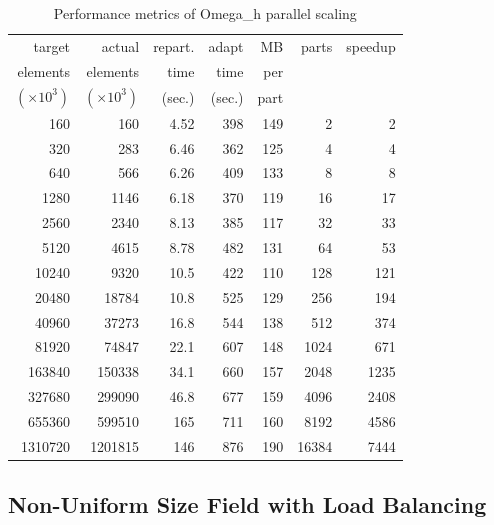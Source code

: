 \begin{table}
\caption{Performance metrics of Omega\_h parallel scaling}
\label{tab:osh_scale}
\begin{center}
\begin{tabular}{r|r|r|r|r|r|r}
target & actual & repart. & adapt &
MB  & parts & speedup \\
elements & elements & time & time &
per & & \\
$(\times 10^3)$ & $(\times 10^3)$ & (sec.) & (sec.) &
part & & \\\hline
     160 &     160 & 4.52 & 398 & 149 &     2 &    2 \\
     320 &     283 & 6.46 & 362 & 125 &     4 &    4 \\
     640 &     566 & 6.26 & 409 & 133 &     8 &    8 \\
    1280 &    1146 & 6.18 & 370 & 119 &    16 &   17 \\
    2560 &    2340 & 8.13 & 385 & 117 &    32 &   33 \\
    5120 &    4615 & 8.78 & 482 & 131 &    64 &   53 \\
   10240 &    9320 & 10.5 & 422 & 110 &   128 &  121 \\
   20480 &   18784 & 10.8 & 525 & 129 &   256 &  194 \\
   40960 &   37273 & 16.8 & 544 & 138 &   512 &  374 \\
   81920 &   74847 & 22.1 & 607 & 148 &  1024 &  671 \\
  163840 &  150338 & 34.1 & 660 & 157 &  2048 & 1235 \\
  327680 &  299090 & 46.8 & 677 & 159 &  4096 & 2408 \\
  655360 &  599510 &  165 & 711 & 160 &  8192 & 4586 \\
 1310720 & 1201815 &  146 & 876 & 190 & 16384 & 7444 \\
\end{tabular}
\end{center}
\end{table}

\subsection{Non-Uniform Size Field with Load Balancing}

